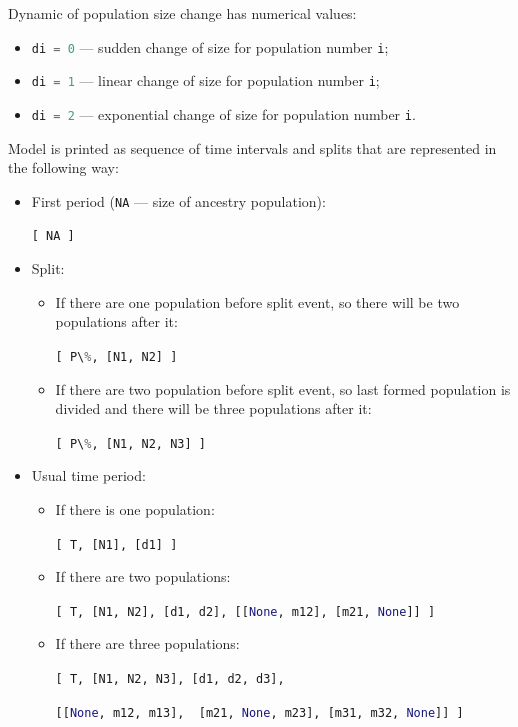 \documentclass[12pt]{article}
\makeatletter
\newcommand{\py}[1]{\lstinline[language=Python, showstringspaces=False]@#1@}
\makeatother
\begin{document}
Dynamic of population size change has numerical values: 
\begin{itemize}
    \item \py{di = 0} --- sudden change of size for population number \py{i};
    \item \py{di = 1} --- linear change of size for population number \py{i};
    \item \py{di = 2} --- exponential change of size for population number \py{i}.
\end{itemize}

Model is printed as sequence of time intervals and splits that are represented in the following way:

\begin{itemize}
    \item First period (\py{NA} --- size of ancestry population):

\py{[ NA ]}

    \item Split:
    \begin{itemize}
        \item If there are one population before split event, so there will be two populations after it:

\py{[ P\%, [N1, N2] ]}
        
    \item If there are two population before split event, so last formed population is divided and there will be three populations after it:

\py{[ P\%, [N1, N2, N3] ]}

    \end{itemize}
    \item Usual time period:
    \begin{itemize}
        \item If there is one population:

\py{[ T, [N1], [d1] ]}

        \item If there are two populations:

\py{[ T, [N1, N2], [d1, d2], [[None, m12], [m21, None]] ]}

        \item If there are three populations:

\py{[ T, [N1, N2, N3], [d1, d2, d3],}

\hspace{2cm} \py{[[None, m12, m13], 
[m21, None, m23], [m31, m32, None]] ]}

    \end{itemize}

\end{itemize}
\end{document}
